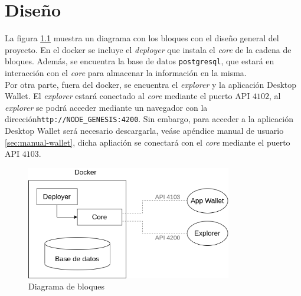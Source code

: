 \chapter{Diseño}
\label{sec:diseno}




La figura \ref{fig:diag-bloques} muestra un diagrama con los bloques con el diseño general del proyecto. En el docker se incluye el \textit{deployer} que instala el \textit{core} de la cadena de bloques. Además, se encuentra la base de datos \texttt{postgresql}, que estará en interacción con el \textit{core} para almacenar la información en la misma.\\

Por otra parte, fuera del docker, se encuentra el \textit{explorer} y la aplicación Desktop Wallet. El \textit{explorer} estará conectado al \textit{core} mediante el puerto API $4102$, al \textit{explorer} se podrá acceder mediante un navegador con la dirección\mbox{\texttt{http://NODE\_GENESIS:4200}}. Sin embargo, para acceder a la aplicación Desktop Wallet será necesario descargarla, veáse apéndice manual de usuario \ref{sec:manual-wallet}, dicha apliación se conectará con el \textit{core} mediante el puerto API $4103$.


\begin{figure}[H]
	\centering
	\includegraphics[width=0.8\textwidth]{figuras/diagrama_bloquesARK.png}
	\caption{Diagrama de bloques}
	\label{fig:diag-bloques}
\end{figure}


